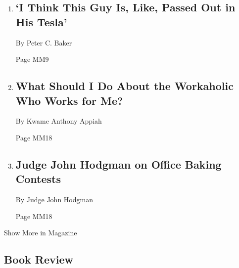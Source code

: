 \begin{enumerate}
\def\labelenumi{\arabic{enumi}.}
\item
  \href{/2019/11/27/magazine/tesla-autopilot-sleeping.html}{}

  \hypertarget{i-think-this-guy-is-like-passed-out-in-his-tesla}{%
  \subsection{`I Think This Guy Is, Like, Passed Out in His
  Tesla'}\label{i-think-this-guy-is-like-passed-out-in-his-tesla}}

  By Peter C. Baker

  Page MM9
\item
  \href{/2019/11/26/magazine/what-should-i-do-about-the-workaholic-who-works-for-me.html}{}

  \hypertarget{what-should-i-do-about-the-workaholic-who-works-for-me}{%
  \subsection{What Should I Do About the Workaholic Who Works for
  Me?}\label{what-should-i-do-about-the-workaholic-who-works-for-me}}

  By Kwame Anthony Appiah

  Page MM18
\item
  \href{/2019/11/27/magazine/judge-john-hodgman-on-office-baking-contests.html}{}

  \hypertarget{judge-john-hodgman-on-office-baking-contests}{%
  \subsection{Judge John Hodgman on Office Baking
  Contests}\label{judge-john-hodgman-on-office-baking-contests}}

  By Judge John Hodgman

  Page MM18
\end{enumerate}

Show More in Magazine

\hypertarget{book-review}{%
\subsection{Book Review}\label{book-review}}

